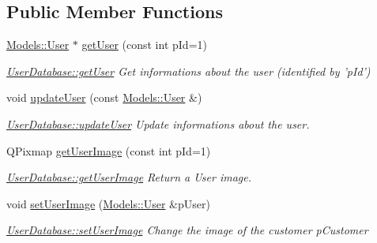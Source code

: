 \subsection*{Public Member Functions}
\begin{DoxyCompactItemize}
\item 
\hyperlink{classModels_1_1User}{Models\-::\-User} $\ast$ \hyperlink{classDatabases_1_1UserDatabase_a476a2b649cc61870a59d6f8df0b376e4}{get\-User} (const int p\-Id=1)
\begin{DoxyCompactList}\small\item\em \hyperlink{classDatabases_1_1UserDatabase_a476a2b649cc61870a59d6f8df0b376e4}{User\-Database\-::get\-User} Get informations about the user (identified by 'p\-Id') \end{DoxyCompactList}\item 
\hypertarget{classDatabases_1_1UserDatabase_a79cd7ce66a5dc13f91a59eb106edd871}{void \hyperlink{classDatabases_1_1UserDatabase_a79cd7ce66a5dc13f91a59eb106edd871}{update\-User} (const \hyperlink{classModels_1_1User}{Models\-::\-User} \&)}\label{classDatabases_1_1UserDatabase_a79cd7ce66a5dc13f91a59eb106edd871}

\begin{DoxyCompactList}\small\item\em \hyperlink{classDatabases_1_1UserDatabase_a79cd7ce66a5dc13f91a59eb106edd871}{User\-Database\-::update\-User} Update informations about the user. \end{DoxyCompactList}\item 
Q\-Pixmap \hyperlink{classDatabases_1_1UserDatabase_aed012bfd2499e0cb005d37ff6f432303}{get\-User\-Image} (const int p\-Id=1)
\begin{DoxyCompactList}\small\item\em \hyperlink{classDatabases_1_1UserDatabase_aed012bfd2499e0cb005d37ff6f432303}{User\-Database\-::get\-User\-Image} Return a User image. \end{DoxyCompactList}\item 
void \hyperlink{classDatabases_1_1UserDatabase_a52db9bc3b67c0c70f162cc593d6985c2}{set\-User\-Image} (\hyperlink{classModels_1_1User}{Models\-::\-User} \&p\-User)
\begin{DoxyCompactList}\small\item\em \hyperlink{classDatabases_1_1UserDatabase_a52db9bc3b67c0c70f162cc593d6985c2}{User\-Database\-::set\-User\-Image} Change the image of the customer {\itshape p\-Customer} \end{DoxyCompactList}\end{DoxyCompactItemize}
